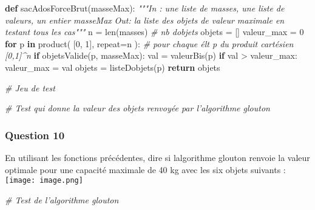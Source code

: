 \documentclass[
  paper=a4,
  ,captions=tableheading
]{scrartcl}
\newenvironment{Shaded}{}{}
\newcommand{\BuiltInTok}[1]{\textcolor[rgb]{0.00,0.50,0.00}{#1}}
\newcommand{\CommentTok}[1]{\textcolor[rgb]{0.38,0.63,0.69}{\textit{#1}}}
\newcommand{\ControlFlowTok}[1]{\textcolor[rgb]{0.00,0.44,0.13}{\textbf{#1}}}
\newcommand{\DecValTok}[1]{\textcolor[rgb]{0.25,0.63,0.44}{#1}}
\newcommand{\KeywordTok}[1]{\textcolor[rgb]{0.00,0.44,0.13}{\textbf{#1}}}
\newcommand{\NormalTok}[1]{#1}
\newcommand{\OperatorTok}[1]{\textcolor[rgb]{0.40,0.40,0.40}{#1}}
\begin{document}
\begin{Shaded}
\begin{Highlighting}[]
\KeywordTok{def}\NormalTok{ sacAdosForceBrut(masseMax):}
    \CommentTok{"""In : une liste de masses, une liste de valeurs, un entier masseMax}
\CommentTok{    Out: la liste des objets de valeur maximale en testant tous les cas"""}
\NormalTok{    n }\OperatorTok{=} \BuiltInTok{len}\NormalTok{(masses)  }\CommentTok{\# nb d\textquotesingle{}objets}
\NormalTok{    objets }\OperatorTok{=}\NormalTok{ []}
\NormalTok{    valeur\_max }\OperatorTok{=} \DecValTok{0}
    \ControlFlowTok{for}\NormalTok{ p }\KeywordTok{in}\NormalTok{ product(}
\NormalTok{        [}\DecValTok{0}\NormalTok{, }\DecValTok{1}\NormalTok{], repeat}\OperatorTok{=}\NormalTok{n}
\NormalTok{    ):  }\CommentTok{\# pour chaque élt p du produit cartésien [0,1]\^{}n}
        \ControlFlowTok{if}\NormalTok{ objetsValide(p, masseMax):}
\NormalTok{            val }\OperatorTok{=}\NormalTok{ valeurBis(p)}
            \ControlFlowTok{if}\NormalTok{ val }\OperatorTok{\textgreater{}}\NormalTok{ valeur\_max:}
\NormalTok{                valeur\_max }\OperatorTok{=}\NormalTok{ val}
\NormalTok{                objets }\OperatorTok{=}\NormalTok{ listeDobjets(p)}
    \ControlFlowTok{return}\NormalTok{ objets}
\end{Highlighting}
\end{Shaded}

\begin{Shaded}
\begin{Highlighting}[]
\CommentTok{\# Jeu de test}
\end{Highlighting}
\end{Shaded}

\begin{Shaded}
\begin{Highlighting}[]
\CommentTok{\# Test qui donne la valeur des objets renvoyée par l’algorithme glouton}
\end{Highlighting}
\end{Shaded}

\hypertarget{question-10}{%
\subsubsection{Question 10}\label{question-10}}

En utilisant les fonctions précédentes, dire si
l\textquotesingle algorithme glouton renvoie la valeur optimale pour une
capacité maximale de 40 kg avec les six objets suivants :
\texttt{[image: image.png]}

\begin{Shaded}
\begin{Highlighting}[]
\CommentTok{\# Test de l’algorithme glouton}
\end{Highlighting}
\end{Shaded}
\end{document}
